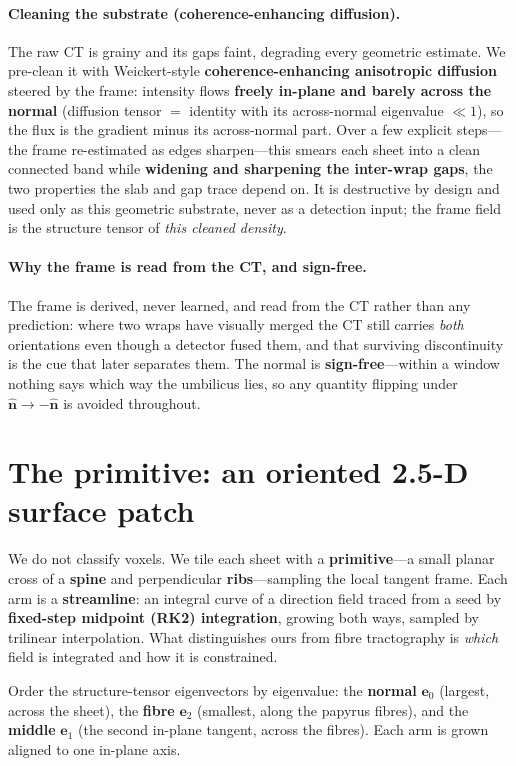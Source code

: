 \documentclass[10pt,twocolumn,a4paper]{article}
\newcommand{\nhat}{\ensuremath{\hat{\mathbf{n}}}}
\begin{document}
\paragraph{Cleaning the substrate (coherence-enhancing diffusion).} The raw CT is
grainy and its gaps faint, degrading every geometric estimate. We pre-clean it
with Weickert-style \textbf{coherence-enhancing anisotropic diffusion}~\cite{weickert}
steered by the frame: intensity flows \textbf{freely in-plane and barely across
the normal} (diffusion tensor $=$ identity with its across-normal eigenvalue
$\ll1$), so the flux is the gradient minus its across-normal part. Over a few
explicit steps---the frame re-estimated as edges sharpen---this smears each sheet
into a clean connected band while \textbf{widening and sharpening the inter-wrap
gaps}, the two properties the slab and gap trace depend on. It is destructive by
design and used only as this geometric substrate, never as a detection input;
the frame field is the structure tensor of \emph{this cleaned density}.

\paragraph{Why the frame is read from the CT, and sign-free.} The frame is
derived, never learned, and read from the CT rather than any prediction: where
two wraps have visually merged the CT still carries \emph{both} orientations even
though a detector fused them, and that surviving discontinuity is the cue that
later separates them. The normal is \textbf{sign-free}---within a window nothing
says which way the umbilicus lies, so any quantity flipping under
$\nhat\to-\nhat$ is avoided throughout.

\section{The primitive: an oriented 2.5-D surface patch}
We do not classify voxels. We tile each sheet with a \textbf{primitive}---a small
planar cross of a \textbf{spine} and perpendicular \textbf{ribs}---sampling the
local tangent frame. Each arm is a \textbf{streamline}: an integral curve of a
direction field traced from a seed by \textbf{fixed-step midpoint (RK2)
integration}, growing both ways, sampled by trilinear interpolation. What
distinguishes ours from fibre tractography is \emph{which} field is integrated
and how it is constrained.

Order the structure-tensor eigenvectors by eigenvalue: the \textbf{normal}
$\mathbf{e}_0$ (largest, across the sheet), the \textbf{fibre} $\mathbf{e}_2$
(smallest, along the papyrus fibres), and the \textbf{middle} $\mathbf{e}_1$ (the
second in-plane tangent, across the fibres). Each arm is grown aligned to one
in-plane axis.
\end{document}
